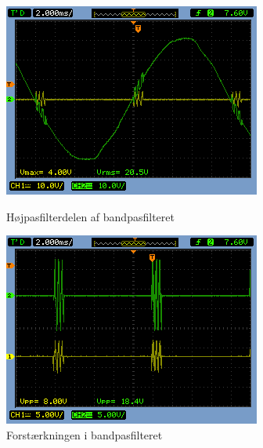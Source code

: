 \begin{figure}[htb]
  \begin{minipage}{0.45\textwidth}
    \centering
	\includegraphics[width=\textwidth]{billeder/HWTest/Decoder/Decoder_hojpasfilter}
		\caption{Højpasfilterdelen af bandpasfilteret}
	\label{fig:Decoder_HP}
  \end{minipage}
  \hspace{0.1\textwidth}
  \begin{minipage}{0.45\textwidth}
    \centering
	\includegraphics[width=\textwidth]{billeder/HWTest/Decoder/Decoder_forstaerkning_baandpas}
		\caption{Forstærkningen i bandpasfilteret}
	\label{fig:Decoder_Gain}
  \end{minipage}
\end{figure}

